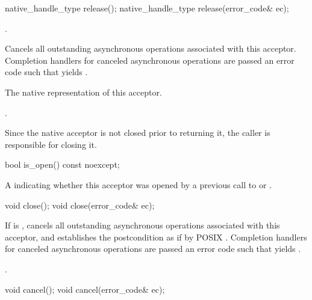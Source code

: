 \begin{itemdecl}
native_handle_type release();
native_handle_type release(error_code& ec);
\end{itemdecl}

\begin{itemdescr}
\pnum
\requires {}.

\pnum
\effects Cancels all outstanding asynchronous operations associated with this acceptor.
Completion handlers for canceled asynchronous operations are passed an error code 
such that  yields .

\pnum
\returns The native representation of this acceptor.

\pnum
\postconditions {}.

\pnum
\remarks Since the native acceptor is not closed prior to returning it,
the caller is responsible for closing it.
\end{itemdescr}

\begin{itemdecl}
bool is_open() const noexcept;
\end{itemdecl}

\begin{itemdescr}
\pnum
\returns A  indicating whether this acceptor was opened by a previous call to  or .
\end{itemdescr}

\begin{itemdecl}
void close();
void close(error_code& ec);
\end{itemdecl}

\begin{itemdescr}
\pnum
\effects If  is , cancels all outstanding asynchronous operations associated with this acceptor, and establishes the postcondition as if by POSIX . Completion handlers for canceled asynchronous operations are passed an error code  such that  yields .

\pnum
\postconditions {}.
\end{itemdescr}

\begin{itemdecl}
void cancel();
void cancel(error_code& ec);
\end{itemdecl}

